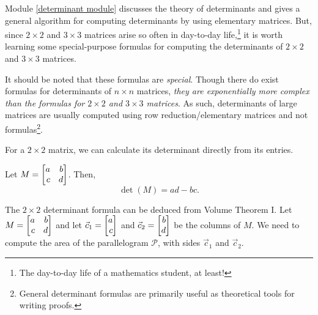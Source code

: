 Module \ref{determinant module} discusses the theory of determinants and gives a general algorithm
for computing determinants by using elementary matrices. But, since $2\times 2$ and $3\times 3$
matrices arise so often in day-to-day life,\footnote{ The day-to-day life of a mathematics student, at least!}
it is worth learning some special-purpose formulas for computing the determinants of $2\times 2$ and $3\times 3$
matrices.

It should be noted that these formulas are \emph{special}. Though there do exist
formulas for determinants of $n\times n$ matrices, \emph{they are exponentially more complex
than the formulas for $2\times 2$ and $3\times 3$ matrices}. As such, determinants of large matrices
are usually computed using row reduction/elementary matrices and not formulas\footnote{
	General determinant formulas are primarily useful as theoretical tools for writing proofs.}.


For a $2\times 2$ matrix, we can calculate its determinant directly from its entries.

\begin{theorem}
	Let $M=\mat{a & b \\ c & d}$. Then,
	\[
		\det(M)=ad-bc.
	\]
\end{theorem}

The $2\times 2$ determinant formula can be deduced from Volume Theorem I.
Let $M=\mat{a&b\\c&d}$ and let $\vec c_1=\mat{a\\c}$ and $\vec c_2=\mat{b\\d}$ be the columns of $M$.
We need to compute the area of the parallelogram $\mathcal P$, with sides $\vec c_1$ and $\vec c_2$.

\begin{center}
\end{center}

